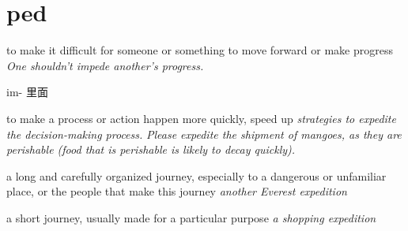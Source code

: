 \chapter{ped}

\begin{vocabulary}[pedal]
\end{vocabulary}

\begin{vocabulary} 
    to make it difficult for someone or something to move forward or make progress
    \textit{One shouldn't impede another's progress.}

    im- 里面
\end{vocabulary}

\begin{vocabulary}
    to make a process or action happen more quickly, speed up
    \textit{strategies to expedite the decision-making process.}
    \textit{Please expedite the shipment of mangoes, as they are perishable (food that is perishable is likely to decay quickly).}
\end{vocabulary}

\begin{vocabulary}[expedition]
    a long and carefully organized journey, especially to a dangerous or unfamiliar place, or the people that make this journey
    \textit{another Everest expedition}

    a short journey, usually made for a particular purpose
    \textit{a shopping expedition}
\end{vocabulary}